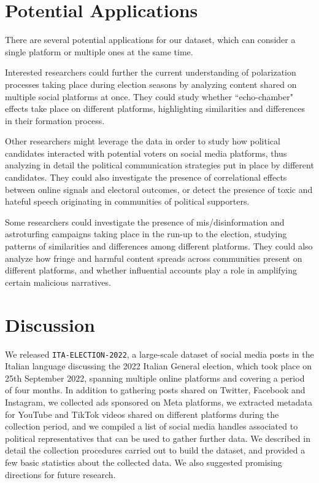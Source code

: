 \documentclass[letterpaper]{article} %
\begin{document}
\section{Potential Applications}
There are several potential applications for our dataset, which can consider a single platform or multiple ones at the same time.

Interested researchers could further the current understanding of polarization processes taking place during election seasons by analyzing content shared on multiple social platforms at once. They could study whether ``echo-chamber" effects take place on different platforms, highlighting similarities and differences in their formation process.

Other researchers might leverage the data in order to study how political candidates interacted with potential voters on social media platforms, thus analyzing in detail the political communication strategies put in place by different candidates. They could also investigate the presence of correlational effects between online signals and electoral outcomes, or detect the presence of toxic and hateful speech originating in communities of political supporters. 

Some researchers could investigate the presence of mis/disinformation and astroturfing campaigns taking place in the run-up to the election, studying patterns of similarities and differences among different platforms. They could also analyze how fringe and harmful content spreads across communities present on different platforms, and whether influential accounts play a role in amplifying certain malicious narratives.

\section{Discussion}
We released \texttt{ITA-ELECTION-2022}, a large-scale dataset of social media posts in the Italian language discussing the 2022 Italian General election, which took place on 25th September 2022, spanning multiple online platforms and covering a period of four months. In addition to gathering posts shared on Twitter, Facebook and Instagram, we collected ads sponsored on Meta platforms, we extracted metadata for YouTube and TikTok videos shared on different platforms during the collection period, and we compiled a list of social media handles associated to political representatives that can be used to gather further data. We described in detail the collection procedures carried out to build the dataset, and provided a few basic statistics about the collected data. We also suggested promising directions for future research.
\end{document}
